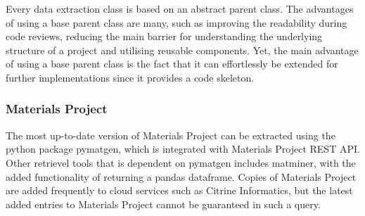 

Every data extraction class is based on an abstract parent class. The advantages of using a base parent class are many, such as improving the readability during code reviews, reducing the main barrier for understanding the underlying structure of a project and utilising reusable components. Yet, the main advantage of using a base parent class is the fact that it can effortlessly be extended for further implementations since it provides a code skeleton.




\subsubsection{Materials Project}
\label{ssec:materialsproject}

The most up-to-date version of Materials Project can be extracted using the python package pymatgen, which is integrated with Materials Project REST API. Other retrievel tools that is dependent on pymatgen includes matminer, with the added functionality of returning a pandas dataframe. Copies of Materials Project are added frequently to cloud services such as Citrine Informatics, but the latest added entries to Materials Project cannot be guaranteed in such a query.

